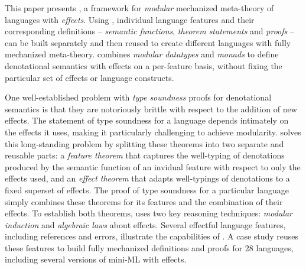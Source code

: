 This paper presents \Name, a framework for \emph{modular}
mechanized meta-theory of languages with \emph{effects}. Using \Name,
individual language features and their corresponding definitions --
\emph{semantic functions}, \emph{theorem statements} and \emph{proofs}
-- can be built separately and then reused to create different
languages with fully mechanized meta-theory.  \name combines
\emph{modular datatypes} and \emph{monads} to define
denotational semantics with effects on a per-feature basis, without fixing the
particular set of effects or language constructs.


One well-established problem with \emph{type soundness} proofs for
denotational semantics is that they are notoriously brittle with
respect to the addition of new effects.
The statement of type soundness for a language depends intimately on the
effects it uses, making it particularly
challenging to achieve modularity. \name solves this long-standing problem by splitting these theorems into
two separate and reusable parts: a \emph{feature theorem} that captures
the well-typing of denotations
produced by the semantic function of an invidual feature with respect
to only the effects used,
and an \emph{effect theorem} that adapts well-typings of denotations to a
fixed superset of effects.
The proof of type soundness for a particular language simply combines these theorems for its features
and the combination of their effects.
%
To establish both theorems, \name uses two key reasoning techniques:
\emph{modular induction} and \emph{algebraic laws} about effects. Several
effectful language features, including references and errors, illustrate the
capabilities of \Name. A case study reuses these features to build fully
mechanized definitions and proofs for 28 languages, including several
versions of mini-ML with effects.



